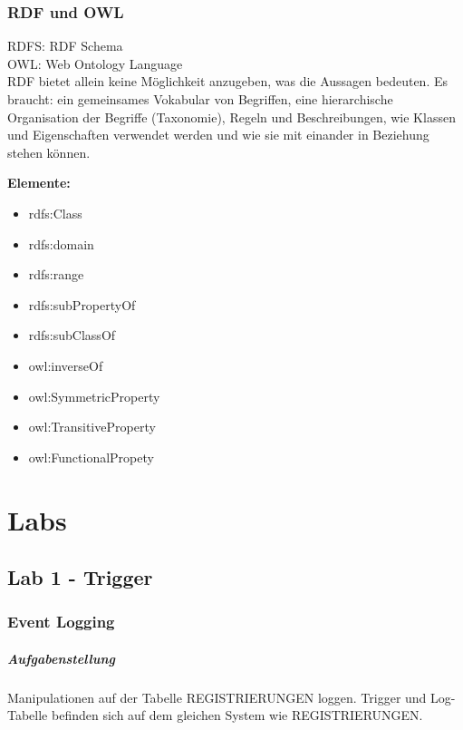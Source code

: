 \documentclass[a4paper,10pt,titlepage=false]{scrreprt}
\begin{document}
\section{RDF und OWL} %
\label{sec:rdf_und_owl}
RDFS: RDF Schema\\
OWL: Web Ontology Language\\
RDF bietet allein keine Möglichkeit anzugeben, was
die Aussagen bedeuten.
Es braucht:
ein gemeinsames Vokabular von Begriffen,
eine hierarchische Organisation der Begriffe
(Taxonomie),
Regeln und Beschreibungen, wie Klassen und
Eigenschaften verwendet werden und wie sie mit
einander in Beziehung stehen können.

\textbf{Elemente:}

\begin{itemize}
  \item rdfs:Class
\item rdfs:domain
\item rdfs:range
\item rdfs:subPropertyOf
\item rdfs:subClassOf
\item owl:inverseOf
\item owl:SymmetricProperty
\item owl:TransitiveProperty
\item owl:FunctionalPropety

\end{itemize}

\part{Labs} %
\label{prt:labs_}
\chapter{Lab 1 - Trigger}
\section{Event Logging}
\subsubsection{Aufgabenstellung}
Manipulationen auf der Tabelle REGISTRIERUNGEN loggen. Trigger und Log-Tabelle befinden sich auf dem gleichen System wie REGISTRIERUNGEN.\\
\end{document}
